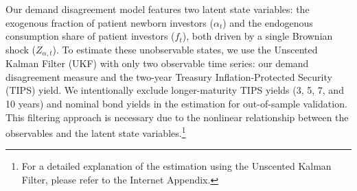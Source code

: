 \documentclass[preprint,11pt,authoryear]{elsarticle}
\theoremstyle{plain}
\begin{document}
Our demand disagreement model features two latent state variables: the exogenous fraction of patient newborn investors ($\alpha_t$) and the endogenous consumption share of patient investors ($f_t$), both driven by a single Brownian shock ($Z_{\alpha,t}$). To estimate these unobservable states, we use the Unscented Kalman Filter (UKF) with only two observable time series: our demand disagreement measure and the two-year Treasury Inflation-Protected Security (TIPS) yield. We intentionally exclude longer-maturity TIPS yields (3, 5, 7, and 10 years) and nominal bond yields in the estimation for out-of-sample validation. This filtering approach is necessary due to the nonlinear relationship between the observables and the latent state variables.\footnote{For a detailed explanation of the estimation using the Unscented Kalman Filter, please refer to the Internet Appendix.}
\end{document}
